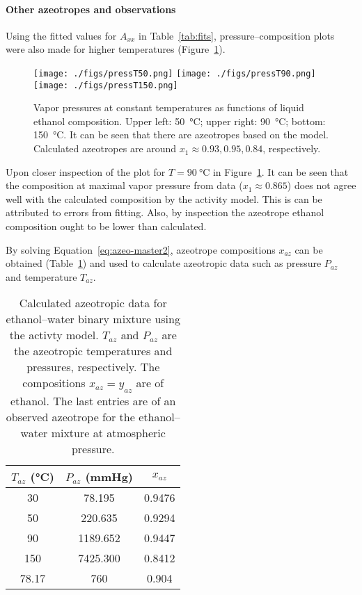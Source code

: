 \paragraph{Other azeotropes and observations}

Using the fitted values for $A_{xx}$ in Table~\ref{tab:fits},
pressure--composition plots were also made for higher temperatures
(Figure~\ref{fig:press-high}).

\begin{figure}[ht]
    \centering
    \texttt{[image: ./figs/pressT50.png]}
    \texttt{[image: ./figs/pressT90.png]}
    \texttt{[image: ./figs/pressT150.png]}
    \caption{Vapor pressures at constant temperatures as functions of 
    liquid ethanol composition. Upper left: \SI{50}{\celsius}; upper
    right: \SI{90}{\celsius}; bottom: \SI{150}{\celsius}. It can be seen
    that there are azeotropes based on the model.
    Calculated azeotropes are around $x_1 \approx 0.93, 0.95, 0.84$, respectively.}
    \label{fig:press-high}
\end{figure}

Upon closer inspection of the plot for $T=\SI{90}{\celsius}$ in 
Figure~\ref{fig:press-high}. It can be seen that the composition at 
maximal vapor pressure from data ($x_1\approx 0.865$) does not agree well 
with the calculated composition by the activity model. This is can be 
attributed to errors from fitting. Also, by inspection the azeotrope ethanol 
composition ought to be lower than calculated.

By solving Equation~\ref{eq:azeo-master2}, azeotrope compositions $x_{az}$
can be obtained (Table~\ref{tab:azeo}) and used to calculate azeotropic data
such as pressure $P_{az}$ and temperature $T_{az}$.

\begin{table}[ht]
    \centering
    \caption{Calculated azeotropic data for ethanol--water binary mixture
    using the activty model. $T_{az}$ and $P_{az}$ are the azeotropic
    temperatures and pressures, respectively. The compositions $x_{az}=
    y_{az}$ are of ethanol. The last entries are of an observed azeotrope
    for the ethanol--water mixture at atmospheric pressure.}
    \medskip
    \begin{tabular}{ccc}
        $T_{az}$ (\si{\celsius}) & $P_{az}$ (\si{\mmHg}) & $x_{az}$ \\ \hline
        \num{30} & \num{78.195} & \num{0.9476} \\
        \num{50} & \num{220.635} & \num{0.9294} \\
        \num{90} & \num{1189.652} & \num{0.9447} \\
        \num{150} & \num{7425.300} & \num{0.8412} \\
        \hline
        \num{78.17} & \num{760} & \num{0.904}
    \end{tabular}
    \label{tab:azeo}
\end{table}

